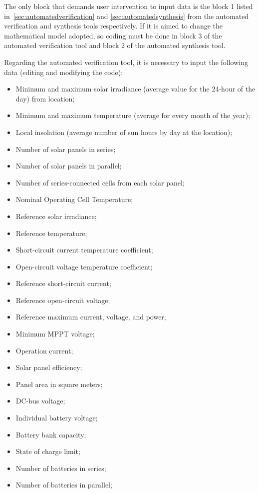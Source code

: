 The only block that demands user intervention to input data is the block 1 listed in~\ref{sec:automatedverification} and \ref{sec:automatedsynthesis} from the automated verification and synthesis tools respectively. If it is aimed to change the mathematical model adopted, so coding must be done in block 3 of the automated verification tool and block 2 of the automated synthesis tool.

Regarding the automated verification tool, it is necessary to input the following data (editing and modifying the code):

\begin{itemize}
\item Minimum and maximum solar irradiance (average value for the 24-hour of the day) from location;
\item Minimum and maximum temperature (average for every month of the year);
\item Local insolation (average number of sun hours by day at the location);
\item Number of solar panels in series;
\item Number of solar panels in parallel;
\item Number of series-connected cells from each solar panel;
\item Nominal Operating Cell Temperature;
\item Reference solar irradiance;
\item Reference temperature;
\item Short-circuit current temperature coefficient;
\item Open-circuit voltage temperature coefficient;
\item Reference short-circuit current;
\item Reference open-circuit voltage;
\item Reference maximum current, voltage, and power;
\item Minimum MPPT voltage;
\item Operation current;
\item Solar panel efficiency;
\item Panel area in square meters;
\item DC-bus voltage;
\item Individual battery voltage;
\item Battery bank capacity;
\item State of charge limit;
\item Number of batteries in series;
\item Number of batteries in parallel;

\end{itemize}
